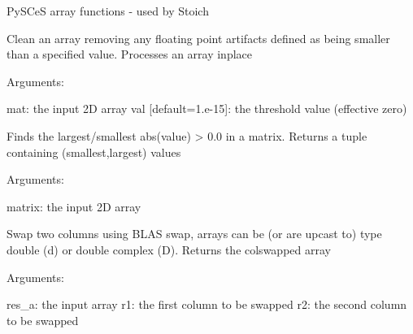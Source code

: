 \documentclass[a4paper,11pt,english]{sphinxmanual}
\begin{document}
\begin{fulllineitems}
\label{modules_doc:cbmpy.PyscesStoich.MathArrayFunc}
PySCeS array functions - used by Stoich

\begin{fulllineitems}
\label{modules_doc:cbmpy.PyscesStoich.MathArrayFunc.MatrixFloatFix}
Clean an array removing any floating point artifacts defined as being smaller than a specified value.
Processes an array inplace

Arguments:

mat: the input 2D array
val {[}default=1.e-15{]}: the threshold value (effective zero)

\end{fulllineitems}


\begin{fulllineitems}
\label{modules_doc:cbmpy.PyscesStoich.MathArrayFunc.MatrixValueCompare}
Finds the largest/smallest abs(value) \textgreater{} 0.0 in a matrix.
Returns a tuple containing (smallest,largest) values

Arguments:

matrix: the input 2D array

\end{fulllineitems}


\begin{fulllineitems}
\label{modules_doc:cbmpy.PyscesStoich.MathArrayFunc.SwapCol}
Swap two columns using BLAS swap, arrays can be (or are upcast to) type double (d) or double complex (D).
Returns the colswapped array

Arguments:

res\_a: the input array
r1: the first column to be swapped
r2: the second column to be swapped

\end{fulllineitems}



\end{fulllineitems}
\end{document}
